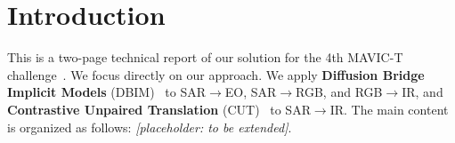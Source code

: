 \section{Introduction}
\label{sec:intro}

This is a two-page technical report of our solution for the 4th MAVIC-T challenge~\cite{lowMultimodalAerialView2024,bowald3rdMultimodalAerial2025}. We focus directly on our approach. We apply \textbf{Diffusion Bridge Implicit Models} (DBIM)~\cite{zhengDiffusionBridgeImplicit2025} to SAR$\rightarrow$EO, SAR$\rightarrow$RGB, and RGB$\rightarrow$IR, and \textbf{Contrastive Unpaired Translation} (CUT)~\cite{parkContrastiveLearningUnpaired2020} to SAR$\rightarrow$IR. The main content is organized as follows: \emph{[placeholder: to be extended]}.
